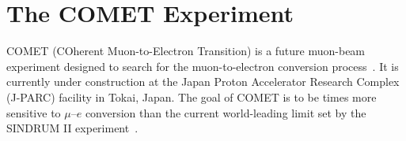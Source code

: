 \chapter{The COMET Experiment}\label{ch:comet}







COMET (COherent Muon-to-Electron Transition) is a future muon-beam experiment
designed to search for the muon-to-electron conversion
process~\cite{the_comet_collaboration_comet_2020}. It is currently under
construction at the Japan Proton Accelerator Research Complex (J-PARC) facility
in Tokai, Japan. The goal of COMET is to be  times more
sensitive to $\mu$--$e$ conversion than the current world-leading limit set by
the SINDRUM II experiment~\cite{Bertl:2006up}. 

